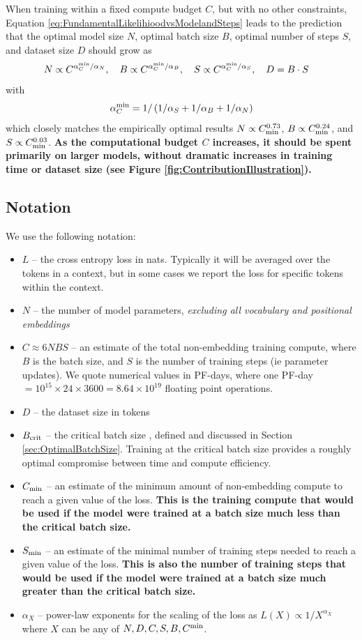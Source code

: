 \documentclass[english]{article}
\newcommand{\be}{\begin{equation}}
\newcommand{\ee}{\end{equation}}
\begin{document}
When training within a fixed compute budget $C$, but with no other constraints, Equation \eqref{eq:FundamentalLikelihioodvsModelandSteps} leads to the prediction that the optimal model size $N$, optimal batch size $B$, optimal number of steps $S$, and dataset size $D$ should grow as 
\be
\label{eq:OptimalModelSizeTrainingTimevsCompute}
N \propto C^{\alpha_{C}^{\rm min} /\alpha_{N}}, \quad
B \propto C^{\alpha_C^{\rm min} / \alpha_B}, \quad
S \propto C^{\alpha_C^{\rm min} / \alpha_S}, \quad
D = B\cdot S \quad
\ee
with
\be
\alpha_{C}^{\rm min} = 1/\left(1/\alpha_{S}+1/\alpha_{B}+1/\alpha_{N}\right) 
\ee
which closely matches the empirically optimal results $N \propto C_{\rm min}^{0.73}$, $B \propto C_{\rm min}^{0.24}$, and $S \propto C_{\rm min}^{0.03}$.
\textbf{As the computational budget $C$ increases, it should be spent primarily on larger models, without dramatic increases in training time or dataset size (see Figure \ref{fig:ContributionIllustration}).}

\subsection{Notation}

We use the following notation:
\begin{itemize}
\item $L$ -- the cross entropy loss in nats.  Typically it will be averaged over the tokens in a context, but in some cases we report the loss for specific tokens within the context.
\item $N$ -- the number of model parameters, \emph{excluding all vocabulary and positional embeddings}  
\item $C \approx 6 N B S$ -- an estimate of the total non-embedding training compute, where $B$ is the batch size, and $S$ is the number of training steps (ie parameter updates). We quote numerical values in PF-days, where one PF-day $ = 10^{15} \times 24 \times 3600 = 8.64 \times 10^{19}$ floating point operations.  
\item $D$ -- the dataset size in tokens
\item $B_{\rm crit}$ -- the critical batch size \cite{1812.06162}, defined and discussed in Section \ref{sec:OptimalBatchSize}.  Training at the critical batch size provides a roughly optimal compromise between time and compute efficiency.
\item $C_{\rm min}$ -- an estimate of the minimum amount of non-embedding compute to reach a given value of the loss.  \textbf{This is the training compute that would be used if the model were trained at a batch size much less than the critical batch size.}  
\item $S_{\rm min}$ -- an estimate of the minimal number of training steps needed to reach a given value of the loss.  \textbf{This is also the number of training steps that would be used if the model were trained at a batch size much greater than the critical batch size.}
\item $\alpha_X$ -- power-law exponents for the scaling of the loss as $L(X) \propto 1/X^{\alpha_X}$ where $X$ can be any of $N, D, C, S, B, C^{\rm min}$.
\end{itemize}
\end{document}
